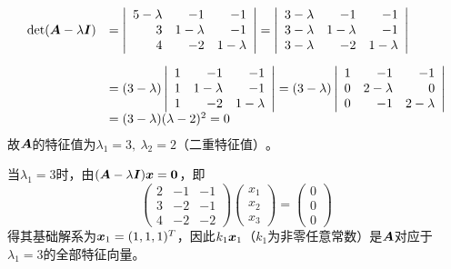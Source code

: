 \begin{frame}\ft{\subsecname}  
  \begin{jie}
    $$
    \begin{array}{rl}
      \mathrm{det}(\boldsymbol{A}-\lambda\boldsymbol{I})
      &=\left|
        \begin{array}{rrr}
          5-\lambda&-1&-1\\
          3&1-\lambda&-1\\
          4&-2&1-\lambda
        \end{array}
                \right| = \left|
                \begin{array}{rrr}
                  3-\lambda&-1&-1\\
                  3-\lambda&1-\lambda&-1\\
                  3-\lambda&-2&1-\lambda
                \end{array}
                                \right|\\[0.3in]
      &= (3-\lambda)\left|
        \begin{array}{rrr}
          1&-1&-1\\
          1&1-\lambda&-1\\
          1&-2&1-\lambda
        \end{array}
                \right|= (3-\lambda)\left|
                \begin{array}{rrr}
                  1&-1&-1\\
                  0&2-\lambda&0\\
                  0&-1&2-\lambda
                \end{array}
                        \right|\\
      &=(3-\lambda)(\lambda-2)^2=0
    \end{array}
    $$
    故$\boldsymbol{A}$的特征值为$\lambda_1=3,~\lambda_2=2\mbox{（二重特征值）}$。

    当$\lambda_1=3$时，由$(\boldsymbol{A}-\lambda\boldsymbol{I}){\boldsymbol{x}}=\boldsymbol{0}$，即
    $$
    \left(
      \begin{array}{rrr}
        2&-1&-1\\
        3&-2&-1\\
        4&-2&-2
      \end{array}
    \right)
    \left(
      \begin{array}{c}
        x_1\\
        x_2\\
        x_3
      \end{array}
    \right)=
    \left(
      \begin{array}{c}
        0\\
        0\\
        0
      \end{array}
    \right)
    $$
    得其基础解系为${\boldsymbol{x}}_1=(1,1,1)^T$，因此$k_1{\boldsymbol{x}}_1$（$k_1$为非零任意常数）是$\boldsymbol{A}$对应于$\lambda_1=3$的全部特征向量。
    \vspace{0.1in}


\end{jie}
\end{frame}
